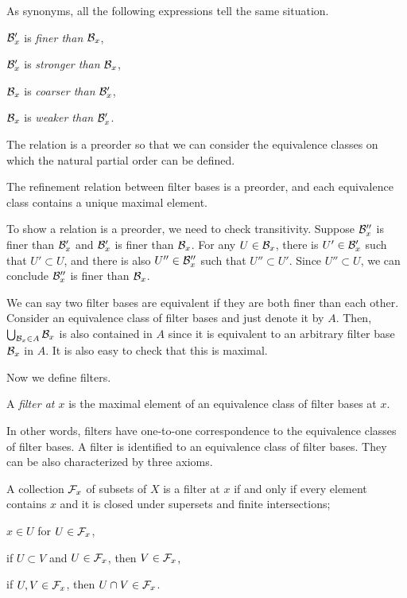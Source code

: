 \documentclass{../crs}
\begin{document}
As synonyms, all the following expressions tell the same situation.
\begin{cond}
\item $\mathcal{B}'_x$ is \emph{finer than} $\mathcal{B}_x$,
\item $\mathcal{B}'_x$ is \emph{stronger than} $\mathcal{B}_x$,
\item $\mathcal{B}_x$ is \emph{coarser than} $\mathcal{B}'_x$,
\item $\mathcal{B}_x$ is \emph{weaker than} $\mathcal{B}'_x$.
\end{cond}
The relation is a preorder so that we can consider the equivalence classes on which the natural partial order can be defined.

\begin{prop}
The refinement relation between filter bases is a preorder, and each equivalence class contains a unique maximal element.
\end{prop}
\begin{pf}
To show a relation is a preorder, we need to check transitivity.
Suppose $\mathcal{B}''_x$ is finer than $\mathcal{B}'_x$ and $\mathcal{B}'_x$ is finer than $\mathcal{B}_x$.
For any $U\in\mathcal{B}_x$, there is $U'\in\mathcal{B}'_x$ such that $U'\subset U$, and there is also $U''\in\mathcal{B}''_x$ such that $U''\subset U'$.
Since $U''\subset U$, we can conclude $\mathcal{B}''_x$ is finer than $\mathcal{B}_x$.

We can say two filter bases are equivalent if they are both finer than each other.
Consider an equivalence class of filter bases and just denote it by $A$.
Then, $\bigcup_{\mathcal{B}_x\in A}\mathcal{B}_x$ is also contained in $A$ since it is equivalent to an arbitrary filter base $\mathcal{B}_x$ in $A$.
It is also easy to check that this is maximal.
\end{pf}

Now we define filters.

\begin{defn}
A \emph{filter at $x$} is the maximal element of an equivalence class of filter bases at $x$.
\end{defn}

In other words, filters have one-to-one correspondence to the equivalence classes of filter bases.
A filter is identified to an equivalence class of filter bases.
They can be also characterized by three axioms.

\begin{thm}
A collection $\mathcal{F}_x$ of subsets of $X$ is a filter at $x$ if and only if every element contains $x$ and it is closed under supersets and finite intersections;
\begin{cond}
\item $x\in U$ for $U\in\mathcal{F}_x$,
\item if $U\subset V$ and $U\in\mathcal{F}_x$, then $V\in\mathcal{F}_x$,
\item if $U,V\in\mathcal{F}_x$, then $U\cap V\in\mathcal{F}_x$.
\end{cond}
\end{thm}
\begin{pf}
\end{pf}
\end{document}
